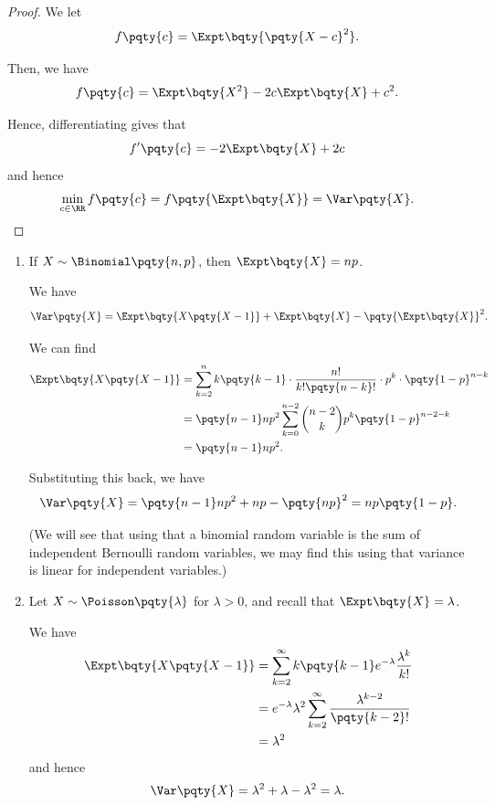 \begin{proof}
    We let
    \[
        f\pqty{c} = \Expt\bqty{\pqty{X - c}^2}.
    \]

    Then, we have
    \[
        f\pqty{c} = \Expt\bqty{X^2} - 2c\Expt\bqty{X} + c^2.
    \]

    Hence, differentiating gives that
    \[
        f'\pqty{c} = -2 \Expt\bqty{X} + 2c
    \]
    and hence
    \[
        \min_{c \in \RR} f\pqty{c} = f\pqty{\Expt\bqty{X}} = \Var\pqty{X}.
    \]
\end{proof}

\begin{examples}
    \label{ex:variance-rv}%
    \begin{enumerate}
        \item If \(X \sim \Binomial\pqty{n, p}\), then \(\Expt\bqty{X} = np\).
        
        We have
        \[
            \Var\pqty{X} = \Expt\bqty{X\pqty{X - 1}} + \Expt\bqty{X} - \pqty{\Expt\bqty{X}}^2.
        \]

        We can find
        \begin{align*}
            \Expt\bqty{X \pqty{X - 1}} &= \sum_{k = 2}^{n} k\pqty{k - 1} \cdot \frac{n!}{k! \pqty{n - k}!} \cdot p^k \cdot \pqty{1 - p}^{n - k} \\
            &= \pqty{n - 1} n p^2 \sum_{k = 0}^{n - 2} \binom{n - 2}{k} p^k \pqty{1 - p}^{n - 2 - k} \\
            &= \pqty{n - 1} n p^2.
        \end{align*}

        Substituting this back, we have
        \[
            \Var\pqty{X} = \pqty{n - 1} np^2 + np - \pqty{np}^2 = np \pqty{1 - p}.
        \]

        (We will see that using that a binomial random variable is the sum of independent Bernoulli random variables, we may find this using that variance is linear for independent variables.)

        \item Let \(X \sim \Poisson\pqty{\lambda}\) for \(\lambda > 0\), and recall that \(\Expt\bqty{X} = \lambda\).
        
        We have
        \begin{align*}
            \Expt\bqty{X \pqty{X - 1}} &= \sum_{k = 2}^{\infty} k \pqty{k - 1} e^{-\lambda} \frac{\lambda^k}{k!} \\
            &= e^{-\lambda} \lambda^2 \sum_{k = 2}^{\infty} \frac{\lambda^{k - 2}}{\pqty{k - 2}!} \\
            &= \lambda^2
        \end{align*}
        and hence
        \[
            \Var\pqty{X} = \lambda^2 + \lambda - \lambda^2 = \lambda.
        \]
    \end{enumerate}
\end{examples}

